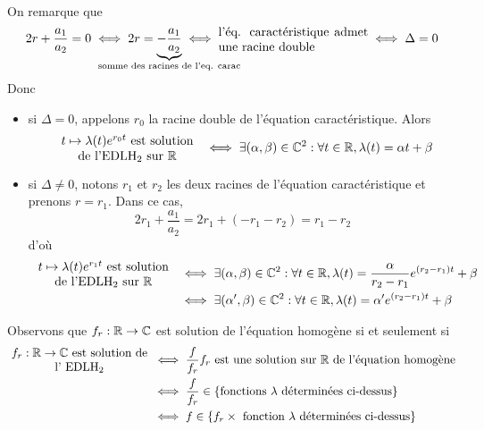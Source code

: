 \documentclass{article}
\renewenvironment{question_kholle}[2][ ]
{
	\subsection{\texorpdfstring{#2}{}}
	\notblank{#1}
	{
		\noindent #1
		\bigbreak
	}
	{}
	\begin{proof}
}
{
	\end{proof}
}
\begin{document}
\begin{question_kholle}
\begin{align*}
	\end{align*}
	On remarque que
	\[
		2r+\frac{a_{1}}{a_{2}}=0 \iff 2r=\underbrace{-\frac{a_{1}}{a_{2}}}_{\mathclap{\text{somme des racines de l’eq. carac}}} \iff \parbox{12em}{l'éq. caractéristique admet une racine double} \iff \Delta=0
	\]
	Donc
	\begin{itemize}[label=$\star$]
		\item si $\Delta=0$, appelons $r_{0}$ la racine double de l'équation caractéristique. Alors
		      \[
			      \parbox{12em}{\centering$t\mapsto \lambda(t) e^{r_{0}t}$ est solution                                                                                                                                                                                            \\ de l’$\mathrm{EDLH_{2}}$ sur \R} \iff \exists(\alpha, \beta)\in\C^{2}: \forall t\in\R, \lambda(t)=\alpha t + \beta
		      \]
		\item si $\Delta\neq 0$, notons $r_{1}$ et $r_{2}$ les deux racines de l'équation caractéristique et prenons $r=r_{1}$. Dans ce cas,
		      \[
			      2r_{1}+\frac{a_{1}}{a_{2}} = 2r_{1} + (-r_{1}-r_{2}) = r_{1}-r_{2}
		      \]
		      d'où
		      \begin{align*}
			      \parbox{12em}{\centering$t\mapsto \lambda(t) e^{r_{1}t}$ est solution                                    \\ de l’$\mathrm{EDLH_{2}}$ sur \R} & \iff \exists(\alpha, \beta)\in\C^{2}: \forall t\in\R, \lambda(t)=\frac{\alpha}{r_{2}-r_{1}}e^{(r_{2}-r_{1})t}+\beta \\
			       & \iff \exists (\alpha ', \beta)\in\C^{2}: \forall t\in\R, \lambda(t)=\alpha ' e^{(r_{2}-r_{1})t}+\beta
		      \end{align*}
	\end{itemize}
	Observons que $f_{r}:\mathbb R\rightarrow \mathbb C$ est solution de l'équation homogène si et seulement si
	\begin{align*}
		\parbox{12em}{\centering $f_{r}:\R\rightarrow\C$ est solution de l' $\mathrm{EDLH_{2}}$} & \iff	\frac{f}{f_{r}}f_{r} \text{ est une solution sur \R de l'équation homogène}         \\
		                                                                                         & \iff \frac{f}{f_{r}} \in \left\{\text{fonctions $\lambda$ déterminées ci-dessus}\right\} \\
		                                                                                         & \iff f\in \left\{f_{r} \times \text{ fonction $\lambda$ déterminées ci-dessus}\right\}

\end{align*}
\end{question_kholle}
\end{document}
